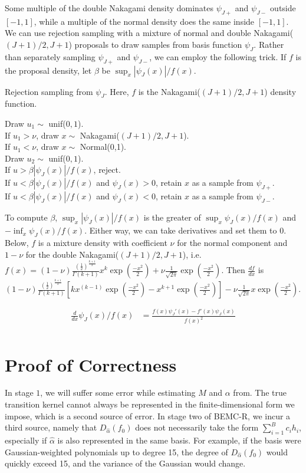\documentclass{article}
\begin{document}
Some multiple of the double Nakagami density dominates $\psi_{J+}$ and $\psi_{J-}$ outside $[-1,1]$, while a multiple of the normal density does the same inside $[-1,1]$. We can use rejection sampling with a mixture of normal and double Nakagami($(J+1)/2, J+1$) proposals to draw samples from basis function $\psi_J$. Rather than separately sampling $\psi_{J+}$ and $\psi_{J-}$, we can employ the following trick. If $f$ is the proposal density, let $\beta$ be $\sup_x |\psi_{J}(x)|/f(x)$. 

\begin{algorithm}[h]
\caption{Rejection sampling from $\psi_{J}$. Here, $f$ is the Nakagami($(J+1)/2, J+1$) density function.} 
Draw $u_1\sim$ unif($0,1$). \\
If $u_1>\nu$, draw $x\sim$ Nakagami($(J+1)/2, J+1$).\\
If $u_1<\nu$, draw $x\sim$ Normal(0,1).\\
Draw $u_2\sim$ unif($0,1$). \\
If $u>\beta|\psi_{J}(x)|/f(x)$, reject.\\
If $u<\beta|\psi_{J}(x)|/f(x)$ and $\psi_{J}(x)>0$, retain $x$ as a sample from $\psi_{J+}$.\\
If $u<\beta|\psi_{J}(x)|/f(x)$ and $\psi_{J}(x)<0$, retain $x$ as a sample from $\psi_{J-}$.\\
\Indp
\Indm
\end{algorithm}

To compute $\beta$, $\sup_x |\psi_{J}(x)|/f(x)$ is the greater of $\sup_x \psi_{J}(x)/f(x)$ and $-\inf_x \psi_{J}(x)/f(x)$. Either way, we can take derivatives and set them to 0. Below, $f$ is a mixture density with coefficient $\nu$ for the normal component and $1-\nu$ for the double Nakagami($(J+1)/2, J+1$), i.e. $f(x) = (1-\nu)\frac{(\frac{1}{2})^{\frac{k+1}{2}}}{ \Gamma(k+1)} x^k\exp(\frac{-x^2}{2}) + \nu \frac{1}{\sqrt{2\pi}}\exp(\frac{-x^2}{2})$. Then $\frac{df}{dx}$ is $(1-\nu)\frac{(\frac{1}{2})^{\frac{k+1}{2}}}{ \Gamma(k+1)} \left[ kx^{(k-1)}\exp(\frac{-x^2}{2}) -x^{k+1}\exp(\frac{-x^2}{2})  \right] - \nu \frac{1}{\sqrt{2\pi}}x\exp(\frac{-x^2}{2})$.

\begin{align*}
\frac{d}{dx} \psi_{J}(x)/f(x)&=\frac{f(x)\psi_{J}'(x)-f'(x)\psi_{J}(x)}{f(x)^2}\\
\end{align*}




 

\section{Proof of Correctness}
In stage $1$, we will suffer some error while estimating $M$ and $\alpha$ from. The true transition kernel cannot always be represented in the finite-dimensional form we impose, which is a second source of error. In stage two of BEMC-R, we incur a third source, namely that $D_{\hat{\alpha}}(f_0)$ does not necessarily take the form $\sum_{i=1}^B c_i h_i$, especially if $\hat{\alpha}$ is also represented in the same basis. For example, if the basis were Gaussian-weighted polynomials up to degree 15, the degree of $D_{\hat{\alpha}}(f_0)$ would quickly exceed 15, and the variance of the Gaussian would change. 



\end{document}
